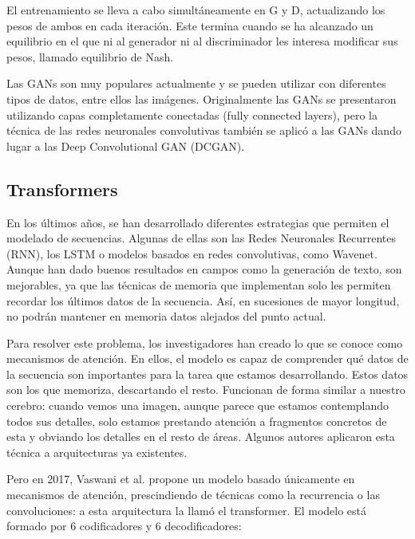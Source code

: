 El entrenamiento se lleva a cabo simultáneamente en G y D, actualizando los pesos de ambos en cada iteración. Este termina cuando se ha alcanzado un equilibrio en el que ni al generador ni al discriminador les interesa modificar sus pesos, llamado equilibrio de Nash.

Las GANs son muy populares actualmente y se pueden utilizar con diferentes tipos de datos, entre ellos las imágenes. Originalmente las GANs se presentaron utilizando capas completamente conectadas (fully connected layers), pero la técnica de las redes neuronales convolutivas también se aplicó a las GANs dando lugar a las Deep Convolutional GAN (DCGAN). \cite{berzal2018redes}

\subsection{Transformers}
En los últimos años, se han desarrollado diferentes estrategias que permiten el modelado de secuencias. Algunas de ellas son las Redes Neuronales Recurrentes (RNN), los LSTM o modelos basados en redes convolutivas, como Wavenet. Aunque han dado buenos resultados en campos como la generación de texto, son mejorables, ya que las técnicas de memoria que implementan solo les permiten recordar los últimos datos de la secuencia. Así, en sucesiones de mayor longitud, no podrán mantener en memoria datos alejados del punto actual.

Para resolver este problema, los investigadores han creado lo que se conoce como mecanismos de atención. En ellos, el modelo es capaz de comprender qué datos de la secuencia son importantes para la tarea que estamos desarrollando. Estos datos son los que memoriza, descartando el resto. Funcionan de forma similar a nuestro cerebro: cuando vemos una imagen, aunque parece que estamos contemplando todos sus detalles, solo estamos prestando atención a fragmentos concretos de esta y obviando los detalles en el resto de áreas. Algunos autores aplicaron esta técnica a arquitecturas ya existentes. 

Pero en 2017, Vaswani et al. \cite{vaswani2017attention} propone un modelo basado únicamente en mecanismos de atención, prescindiendo de técnicas como la recurrencia o las convoluciones: a esta arquitectura la llamó el transformer. El modelo está formado por 6 codificadores y 6 decodificadores:

